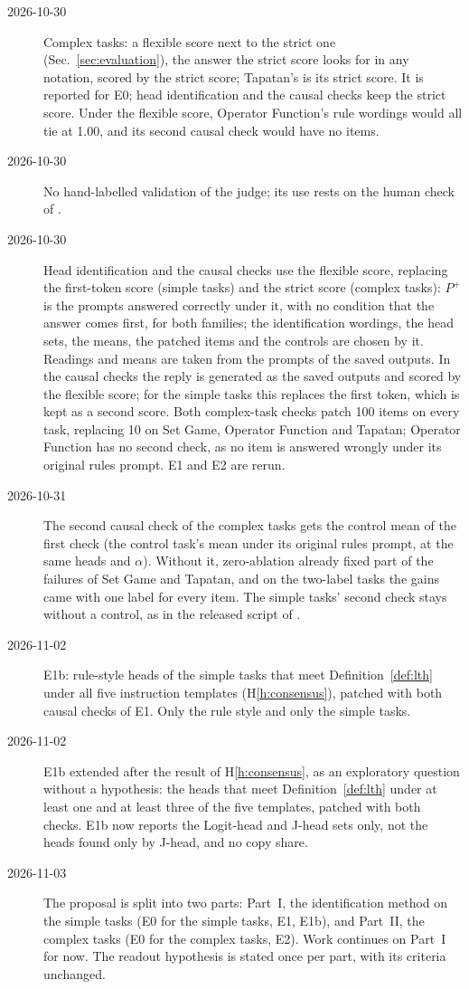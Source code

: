 \documentclass[11pt,a4paper]{article}
\begin{document}
\begin{description}
\item[2026-10-30] Complex tasks: a flexible score next to the strict one (Sec.~\ref{sec:evaluation}), the answer the strict score looks for in any notation, scored by the strict score; Tapatan's is its strict score. It is reported for E0; head identification and the causal checks keep the strict score. Under the flexible score, Operator Function's rule wordings would all tie at 1.00, and its second causal check would have no items.
\item[2026-10-30] No hand-labelled validation of the judge; its use rests on the human check of \citet{hua2025flaw}.
\item[2026-10-30] Head identification and the causal checks use the flexible score, replacing the first-token score (simple tasks) and the strict score (complex tasks): $P^{+}$ is the prompts answered correctly under it, with no condition that the answer comes first, for both families; the identification wordings, the head sets, the means, the patched items and the controls are chosen by it. Readings and means are taken from the prompts of the saved outputs. In the causal checks the reply is generated as the saved outputs and scored by the flexible score; for the simple tasks this replaces the first token, which is kept as a second score. Both complex-task checks patch 100 items on every task, replacing 10 on Set Game, Operator Function and Tapatan; Operator Function has no second check, as no item is answered wrongly under its original rules prompt. E1 and E2 are rerun.
\item[2026-10-31] The second causal check of the complex tasks gets the control mean of the first check (the control task's mean under its original rules prompt, at the same heads and $\alpha$). Without it, zero-ablation already fixed part of the failures of Set Game and Tapatan, and on the two-label tasks the gains came with one label for every item. The simple tasks' second check stays without a control, as in the released script of \citet{yang2026shared}.
\item[2026-11-02] E1b: rule-style heads of the simple tasks that meet Definition~\ref{def:lth} under all five instruction templates (H\ref{h:consensus}), patched with both causal checks of E1. Only the rule style and only the simple tasks.
\item[2026-11-02] E1b extended after the result of H\ref{h:consensus}, as an exploratory question without a hypothesis: the heads that meet Definition~\ref{def:lth} under at least one and at least three of the five templates, patched with both checks. E1b now reports the Logit-head and J-head sets only, not the heads found only by J-head, and no copy share.
\item[2026-11-03] The proposal is split into two parts: Part~I, the identification method on the simple tasks (E0 for the simple tasks, E1, E1b), and Part~II, the complex tasks (E0 for the complex tasks, E2). Work continues on Part~I for now. The readout hypothesis is stated once per part, with its criteria unchanged.
\end{description}
\end{document}
